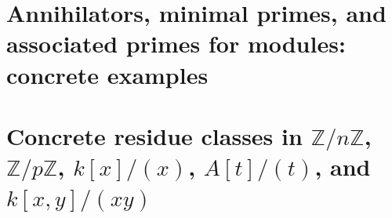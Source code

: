 \documentclass[12pt,a4paper,oneside]{report}
\theoremstyle{notespace}
\begin{document}
\chapter{Annihilators, minimal primes, and associated primes for modules: concrete examples}

\chapter{Concrete residue classes in \(\mathbb Z/n\mathbb Z\), \(\mathbb Z/p\mathbb Z\), \(k[x]/(x)\), \(A[t]/(t)\), and \(k[x,y]/(xy)\)}
\end{document}
